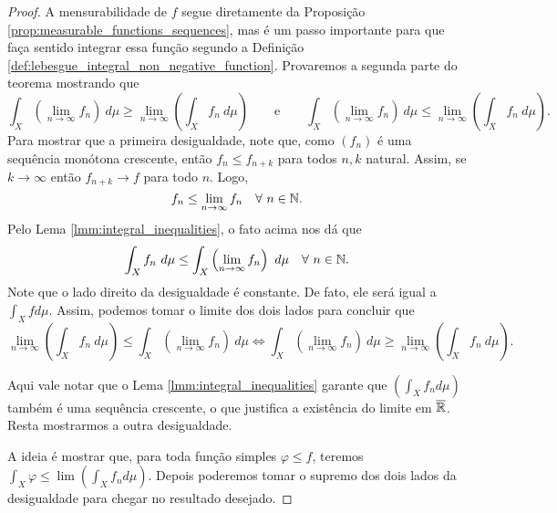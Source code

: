 \begin{proof}
    A mensurabilidade de $f$ segue diretamente da Proposição \ref{prop:measurable_functions_sequences}, mas é um passo importante para que faça sentido integrar essa função segundo a Definição \ref{def:lebesgue_integral_non_negative_function}. Provaremos a segunda parte do teorema mostrando que
    \begin{equation*}
        \int_{X} \left(\lim_{n\rightarrow \infty} f_n\right) \ d\mu \geq \lim_{n\rightarrow \infty} \left( 
 \int_{X} f_n \ d\mu\right) \quad \quad \text{e} \quad \quad \int_{X} \left(\lim_{n\rightarrow \infty} f_n\right) \ d\mu \leq \lim_{n\rightarrow \infty} \left( 
 \int_{X} f_n \ d\mu\right).
    \end{equation*}
    Para mostrar que a primeira desigualdade, note que, como $(f_n)$ é uma sequência monótona crescente, então $f_n\leq f_{n+k}$ para todos $n,k$ natural. Assim, se $k\rightarrow \infty$ então $f_{n+k} \rightarrow f$ para todo $n$. Logo,
    \begin{equation*}
        f_n \leq \lim_{n\rightarrow \infty}f_n \quad \forall \ n\in\mathbb{N}.
    \end{equation*}
    Pelo Lema \ref{lmm:integral_inequalities}, o fato acima nos dá que
    \begin{equation*}
        \int_{X} f_n \ d\mu \leq \int_{X} \left(\lim_{n\rightarrow \infty} f_n\right) \ d\mu \quad \forall \ n\in\mathbb{N}.
    \end{equation*}
    Note que o lado direito da desigualdade é constante. De fato, ele será igual a $\int_X f d\mu$. Assim, podemos tomar o limite dos dois lados para concluir que
    \begin{equation*}
        \lim_{n\rightarrow \infty}\left(\int_{X} f_n \ d\mu\right) \leq \int_{X} \left(\lim_{n\rightarrow \infty} f_n\right) \ d\mu \Longleftrightarrow \int_{X} \left(\lim_{n\rightarrow \infty} f_n\right) \ d\mu \geq \lim_{n\rightarrow \infty} \left( 
 \int_{X} f_n \ d\mu\right).
    \end{equation*}

    Aqui vale notar que o Lema \ref{lmm:integral_inequalities} garante que $\left(\int_X f_n d\mu\right)$ também é uma sequência crescente, o que justifica a existência do limite em $\overline{\mathbb{R}}$. Resta mostrarmos a outra desigualdade.
    
    A ideia é mostrar que, para toda função simples $\varphi \leq f$, teremos $\int_X \varphi \leq \lim (\int_X f_n d\mu)$. Depois poderemos tomar o supremo dos dois lados da desigualdade para chegar no resultado desejado.


\end{proof}
